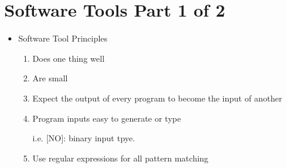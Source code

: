\documentclass[12pt]{article}
\begin{document}
\section*{Software Tools Part 1 of 2}
\begin{itemize}
    \item Software Tool Principles
    \begin{enumerate}[1.]
        \item Does one thing well
        \item Are small
        \item Expect the output of every program to become the input of another
        \item Program inputs easy to generate or type

        \bigskip

        i.e. [NO]: binary input tpye.
        \item Use regular expressions for all pattern matching
    \end{enumerate}
\end{itemize}
\end{document}
